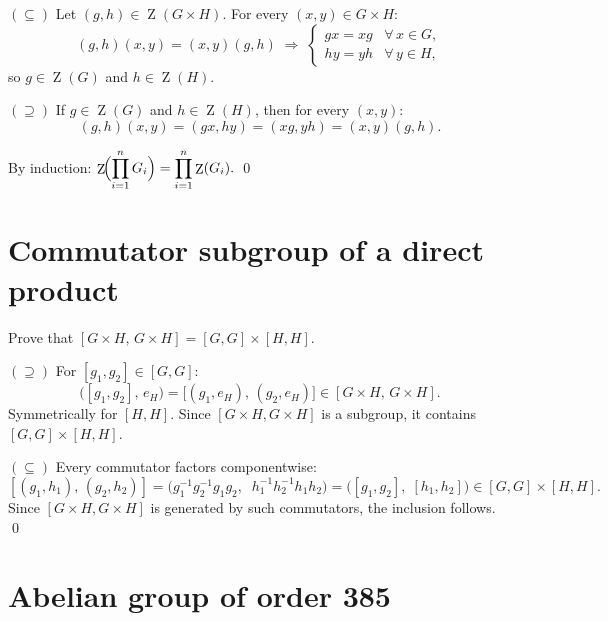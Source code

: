 \documentclass[12pt,a4paper]{article}
\newenvironment{problem}{\begin{mdframed}[style=problemstyle]}{\end{mdframed}}
\newenvironment{sol}{\begin{mdframed}[style=solstyle]}{\end{mdframed}}
\DeclareMathOperator{\Cent}{Z}
\begin{document}
\begin{sol}
\noindent$(\subseteq)$\;
Let $(g,h) \in \Cent(G \times H)$.
For every $(x,y) \in G \times H$:
\[
  (g,h)(x,y) = (x,y)(g,h)
  \;\Longrightarrow\;
  \begin{cases} gx = xg & \forall\, x \in G,\\[2pt] hy = yh & \forall\, y \in H, \end{cases}
\]
so $g \in \Cent(G)$ and $h \in \Cent(H)$.

\medskip
\noindent$(\supseteq)$\;
If $g \in \Cent(G)$ and $h \in \Cent(H)$, then for every $(x,y)$:
\[
  (g,h)(x,y) = (gx,hy) = (xg,yh) = (x,y)(g,h).
\]

By induction: $\displaystyle\Cent\!\Bigl(\prod_{i=1}^{n} G_i\Bigr) = \prod_{i=1}^{n} \Cent(G_i).$ \qed
\end{sol}

\bigskip
\section{Commutator subgroup of a direct product}

\begin{problem}
Prove that $[G \times H,\, G \times H] = [G,G] \times [H,H]$.
\end{problem}

\begin{sol}
\noindent$(\supseteq)$\;
For $[g_1,g_2] \in [G,G]$:
\[
  \bigl([g_1,g_2],\, e_H\bigr)
  = \bigl[(g_1,e_H),\,(g_2,e_H)\bigr]
  \in [G \times H,\, G \times H].
\]
Symmetrically for $[H,H]$. Since $[G\times H, G\times H]$ is a subgroup, it
contains $[G,G] \times [H,H]$.

\medskip
\noindent$(\subseteq)$\;
Every commutator factors componentwise:
\[
  [(g_1,h_1),\,(g_2,h_2)]
  = \bigl(g_1^{-1}g_2^{-1}g_1 g_2,\;\; h_1^{-1}h_2^{-1}h_1 h_2\bigr)
  = \bigl([g_1,g_2],\;[h_1,h_2]\bigr)
  \in [G,G] \times [H,H].
\]
Since $[G \times H, G \times H]$ is generated by such commutators, the inclusion follows. \qed
\end{sol}

\bigskip
\section{Abelian group of order 385}
\end{document}
